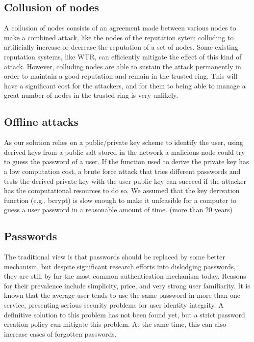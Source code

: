 \subsection{Collusion of nodes}

A collusion of nodes consists of an agreement made between various nodes to make
a combined attack, like the nodes of the reputation sytem colluding to artificially increase or decrease the reputation of a
set of nodes. Some existing
reputation systems, like WTR, can efficiently mitigate the effect of this kind
of attack. However, colluding nodes are able to sustain the attack
permanently in order to maintain a good reputation and remain in the trusted ring.
This will have a significant cost for the attackers, and for them to being able to manage a
great number of nodes in the trusted ring is very unlikely. 

\subsection{Offline attacks}
As our solution relies on a public/private key scheme to identify the user,
using derived keys from a public salt stored in the network a malicious node
could try to guess the password of a user. If the function used to derive the
private key has a low computation cost, a brute force attack that tries
different passwords and tests the derived private key with the user public key
can succeed if the attacker has the computational resources to do so. We
assumed that the key derivation function (e.g., bcrypt) is slow enough to make
it unfeasible for a computer to guess a user password in a reasonable 
amount of time. (more than 20 years)

\subsection{Passwords}
The traditional view is that passwords should be replaced by some better
mechanism, but despite significant research efforts into dislodging passwords,
they are still by far the most common authentication mechanism today.
Reasons for their prevalence include simplicity, price, and very strong user
familiarity.
It is known that the average user tends to use the
same password in more than one service, presenting serious security problems
for user identity integrity. A definitive solution to this problem has not
been found yet, but a strict password creation policy can mitigate this
problem. At the same time, this can also increase cases of forgotten passwords.

